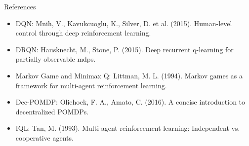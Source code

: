 \documentclass{beamer}
\begin{document}
\begin{frame}[plain]{}
\end{frame}


\begin{frame}{References}
\begin{itemize}
    \item DQN: Mnih, V., Kavukcuoglu, K., Silver, D. et al. (2015). Human-level control through deep reinforcement learning.
    \item DRQN: Hausknecht, M., Stone, P. (2015). Deep recurrent q-learning for partially observable mdps.
    \item Markov Game and Minimax Q: Littman, M. L. (1994). Markov games as a framework for multi-agent reinforcement learning.
    \item Dec-POMDP: Oliehoek, F. A., Amato, C. (2016). A concise introduction to decentralized POMDPs.
    \item IQL: Tan, M. (1993). Multi-agent reinforcement learning: Independent vs. cooperative agents.
\end{itemize}
\end{frame}
\end{document}
